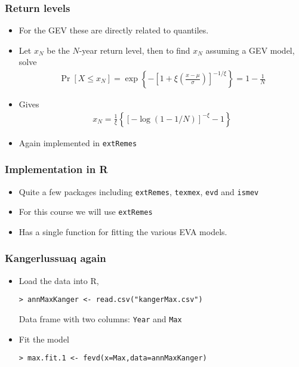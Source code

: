 \documentclass[dvipsnames]{beamer}
\begin{document}
\begin{frame}
\frametitle{Return levels}
\begin{itemize}
\item
For the GEV these are directly related to quantiles.
\item
Let $x_N$ be the $N$-year return level, then to find $x_N$ assuming a GEV model, solve
\begin{eqnarray*}
\Pr[X\leq x_N]=\exp\left\{-\left[1+\xi\left(\frac{x-\mu}{\sigma}\right)\right]^{-1/\xi}\right\}=1-\frac{1}{N}
\end{eqnarray*}
\item
Gives
\begin{eqnarray*}
x_N=\frac{1}{\xi}\left\{\left[-\log(1-1/N)\right]^{-\xi}-1\right\}
\end{eqnarray*}
\item
Again implemented in \texttt{extRemes}
\end{itemize}
\end{frame}

\begin{frame}[fragile]
\frametitle{Implementation in \textsf{R}}
\begin{itemize}
\item
Quite a few packages including \texttt{extRemes}, \texttt{texmex}, \texttt{evd} and \texttt{ismev}
\item
For this course we will use \texttt{extRemes}
\item
Has a single function for fitting the various EVA models.
\end{itemize}
\end{frame}

\begin{frame}[fragile]
\frametitle{Kangerlussuaq again}
\begin{itemize}
\item
Load the data into \textsf{R},
\begin{verbatim}
> annMaxKanger <- read.csv("kangerMax.csv")
\end{verbatim}
Data frame with two columns: \texttt{Year} and \texttt{Max}
\item
Fit the model
\begin{verbatim}
> max.fit.1 <- fevd(x=Max,data=annMaxKanger)
\end{verbatim}
\end{itemize}
\end{frame}
\end{document}
